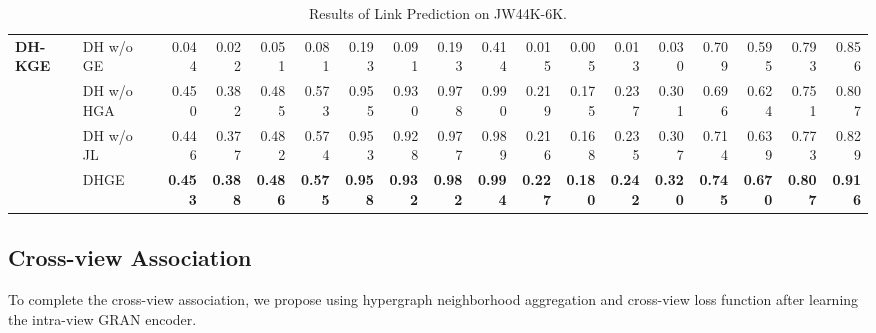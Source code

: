 \documentclass[letterpaper]{article} \usepackage{aaai23}  \usepackage{times}  \usepackage{helvet}  \usepackage{courier}  \usepackage[hyphens]{url}  \usepackage{graphicx} \urlstyle{rm} \def\UrlFont{\rm}  \usepackage{natbib}  \usepackage{caption} \frenchspacing  \setlength{\pdfpagewidth}{8.5in}  \setlength{\pdfpageheight}{11in}  \usepackage{times}
\begin{document}
\begin{table*}[t]
{\begin{tabular}{llrrrr|rrrr|rrrr|rrrr}
 \midrule \midrule
\multirow{4}{*}{\textbf{DH-KGE}} & DH w/o GE & 0.044 & 0.022 & 0.051 & 0.081 & 0.193 & 0.091 & 0.193 & 0.414 & 0.015 & 0.005 & 0.013 & 0.030 & 0.709 & 0.595 & 0.793 & 0.856 \\
 & DH w/o HGA & 0.450 & 0.382 & 0.485 & 0.573 & 0.955 & 0.930 & 0.978 & 0.990 & 0.219 & 0.175 & 0.237 & 0.301 & 0.696 & 0.624 & 0.751 & 0.807 \\
 & DH w/o JL & 0.446 & 0.377 & 0.482 & 0.574 & 0.953 & 0.928 & 0.977 & 0.989 & 0.216 & 0.168 & 0.235 & 0.307 & 0.714 & 0.639 & 0.773 & 0.829 \\
 & DHGE & \textbf{0.453} & \textbf{0.388} & \textbf{0.486} & \textbf{0.575} & \textbf{0.958} & \textbf{0.932} & \textbf{0.982} & \textbf{0.994} & \textbf{0.227} & \textbf{0.180} & \textbf{0.242} & \textbf{0.320} & \textbf{0.745} & \textbf{0.670} & \textbf{0.807} & \textbf{0.916}\\
\bottomrule                        
\end{tabular}}
\caption{\label{t4}
Results of Link Prediction on JW44K-6K. 
}
\end{table*}

\subsection{Cross-view Association}

To complete the cross-view association, we propose using hypergraph neighborhood aggregation and cross-view loss function after learning the intra-view GRAN encoder.
\end{document}

